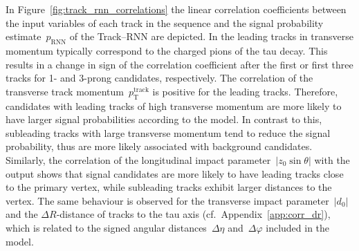 In Figure~\ref{fig:track_rnn_correlations} the linear correlation coefficients
between the input variables of each track in the sequence and the signal
probability estimate~$p_\text{RNN}$ of the Track--RNN are depicted. In
\tauhadvis the leading tracks in transverse momentum typically correspond to the
charged pions of the tau decay. This results in a change in sign of the
correlation coefficient after the first or first three tracks for 1- and 3-prong
candidates, respectively. The correlation of the transverse track
momentum~$p_\text{T}^\text{track}$
is positive for the leading tracks. Therefore, \tauhadvis candidates with
leading tracks of high transverse momentum are more likely to have larger signal
probabilities according to the model. In contrast to this, subleading tracks
with large transverse momentum tend to reduce the signal probability, thus are
more likely associated with background \tauhadvis candidates. Similarly, the
correlation of the longitudinal impact parameter~$|z_0 \sin\theta|$ with the
output
shows that signal candidates are more likely to have leading tracks close to the
primary vertex, while subleading tracks exhibit larger distances to the vertex.
The same behaviour is observed for the transverse impact parameter~$|d_0|$ and
the $\Delta R$-distance of tracks to the tau axis (cf.\
Appendix~\ref{app:corr_dr}), which is related to the signed angular
distances~$\Delta \eta$ and~$\Delta \varphi$ included in the model.

